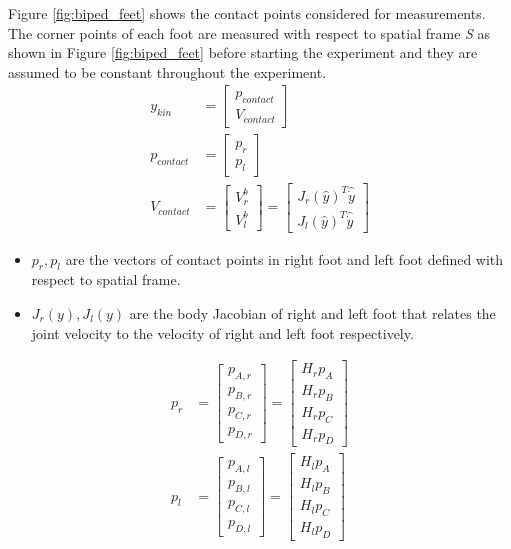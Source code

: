  Figure \ref{fig:biped_feet} shows the contact points considered for measurements. The corner points of each foot are measured with respect to spatial frame \emph{S} as shown in Figure \ref{fig:biped_feet} before starting the experiment and they are assumed to be constant throughout the experiment.
\begin{equation}
    \label{eq:y_kin}
    \begin{split}
    y_{kin} &=
    \begin{bmatrix}
    p_{contact} \\ V_{contact}
    \end{bmatrix}\\
    p_{contact} &= \begin{bmatrix}p_{r}\\ p_{l}\end{bmatrix}\\
     V_{contact} &= \begin{bmatrix} V_{r}^b \\ V_{l}^b \end{bmatrix} = \begin{bmatrix} J_r(\hat{y})^T \hat{\dot{y}} \\ J_l(\hat{y})^T\hat{\dot{y}} \end{bmatrix}
    \end{split}
\end{equation}
\begin{itemize}
\item $p_{r},p_{l}$ are the vectors of contact points in right foot and left foot defined with respect to spatial frame.
\item $J_r(y), J_l(y)$ are the body Jacobian of right and left foot that relates the joint velocity to the velocity of right and left foot respectively.
\end{itemize}
\begin{equation}
    \begin{split}
    p_{r} &= \begin{bmatrix} p_{A,r}\\ p_{B,r}\\ p_{C,r}\\ p_{D,r}\end{bmatrix}= \begin{bmatrix} {H}_{r}p_{A}\\  {H}_{r}p_{B}\\  {H}_{r}p_{C}\\  {H}_{r}p_{D}\end{bmatrix} \\
    p_{l} &= \begin{bmatrix} p_{A,l}\\ p_{B,l}\\ p_{C,l}\\ p_{D,l}\end{bmatrix}= \begin{bmatrix} {H}_{l}p_{A}\\  {H}_{l}p_{B}\\  {H}_{l}p_{C}\\  {H}_{l}p_{D}\end{bmatrix} \\
    \end{split}
\end{equation}
